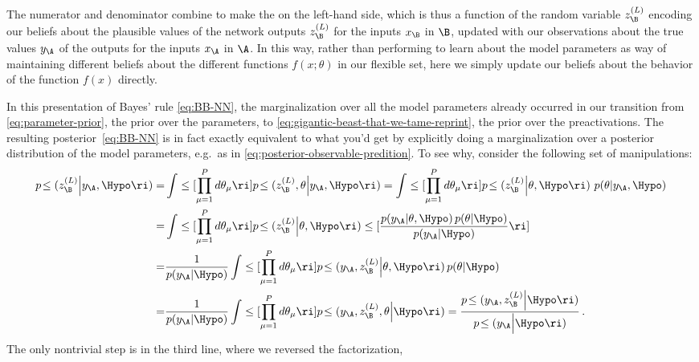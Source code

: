The numerator and denominator combine to make the  on the left-hand side, which is thus a function of the random variable $z_{\B}^{(L)}$ encoding our  beliefs about the plausible values of the network outputs $z_{\B}^{(L)}$ for the inputs $x_\B$ in $\B$, updated with our observations about the true values $y_{\A}$ of the outputs for the inputs $x_\A$ in $\A$.
In this way, rather than performing  to learn about the model parameters as way of maintaining different beliefs about the different functions $f(x; \theta)$ in our flexible set, here we simply update our beliefs about the behavior of the function $f(x)$ directly.

In this presentation of Bayes' rule \eqref{eq:BB-NN}, the marginalization over all the model parameters already occurred in our transition from \eqref{eq:parameter-prior}, the prior over the parameters, to \eqref{eq:gigantic-beast-that-we-tame-reprint}, the prior over the preactivations. The resulting posterior~\eqref{eq:BB-NN} is in fact exactly equivalent to what you'd get by explicitly doing a marginalization over a posterior distribution of the model parameters, e.g.~as in \eqref{eq:posterior-observable-predition}. %
To see why, consider the following set of manipulations:
\begin{align}
p\!\le(z_{\B}^{(L)}\Big\vert y_{\A}, \Hypo \ri)=&\int \le[  \prod_{\mu=1}^{P} d \theta_{\mu}\ri] p\!\le(z_{\B}^{(L)}, \theta \Big\vert y_{\A},\Hypo\ri)=\int \le[  \prod_{\mu=1}^{P} d \theta_{\mu}\ri] p\!\le(z_{\B}^{(L)}\Big\vert \theta, \Hypo \ri)\ p(\theta \vert y_{\A},\Hypo)\, \notag\\
=&\int \le[  \prod_{\mu=1}^{P} d \theta_{\mu}\ri] p\!\le(z_{\B}^{(L)}\Big\vert \theta, \Hypo \ri) \le[ \frac{p(y_{\A}\vert \theta,\Hypo) \, p(\theta\vert\Hypo)}{p(y_{\A}\vert\Hypo)}\ri] \, \notag\\
=&\frac{1}{p(y_{\A}\vert\Hypo)}\int \le[  \prod_{\mu=1}^{P} d \theta_{\mu}\ri] p\!\le(y_{\A}, z_{\B}^{(L)}\Big\vert \theta, \Hypo \ri) \, p(\theta\vert\Hypo) \notag\\
=&\frac{1}{p(y_{\A}\vert\Hypo)}\int \le[  \prod_{\mu=1}^{P} d \theta_{\mu}\ri] p\!\le(y_{\A}, z_{\B}^{(L)}, \theta\Big\vert \Hypo \ri) =\frac{p\!\le(y_{\A},z_{\B}^{(L)}\Big\vert  \Hypo \ri)}{p\!\le(y_{\A}\Big\vert  \Hypo \ri)}\,  .\label{eq:BB-NN-long}
\end{align}
The only nontrivial step is 
in the third line, where we reversed the factorization,
\be\label{eq:factorization-joint-network-outputs}
